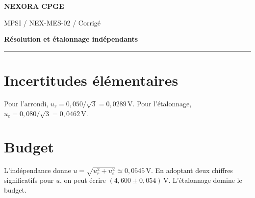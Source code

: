 \documentclass[11pt,a4paper]{article}
\begin{document}
{\small\bfseries\color{nexorablue} NEXORA CPGE}\par
{\small MPSI / NEX-MES-02 / Corrigé}\par
{\LARGE\bfseries Résolution et étalonnage indépendants}\par
\vspace{0.25em}\hrule\vspace{0.6em}

\section*{Incertitudes élémentaires}
Pour l’arrondi, $u_r=0{,}050/\sqrt3=0{,}0289\,\mathrm V$. Pour l’étalonnage, $u_e=0{,}080/\sqrt3=0{,}0462\,\mathrm V$.

\section*{Budget}
L’indépendance donne $u=\sqrt{u_r^2+u_e^2}\simeq0{,}0545\,\mathrm V$. En adoptant deux chiffres significatifs pour $u$, on peut écrire $(4{,}600\pm0{,}054)\,\mathrm V$. L’étalonnage domine le budget.
\end{document}
